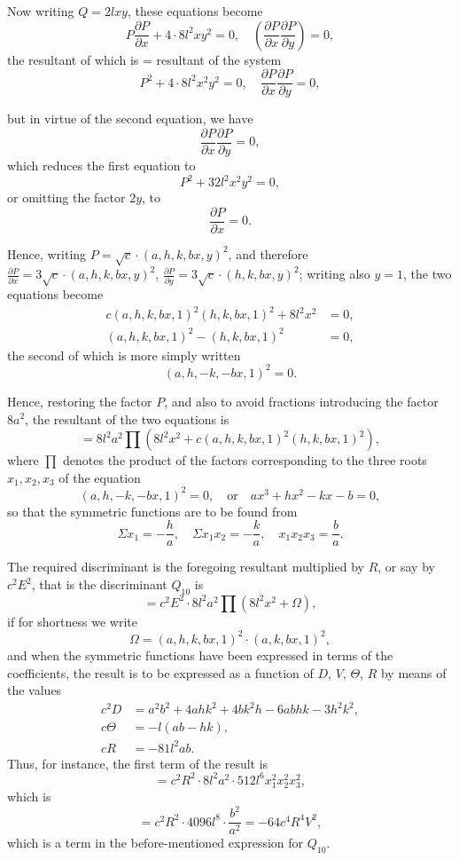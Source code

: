 \documentclass[11pt,a4paper]{article}
\theoremstyle{definition}
\begin{document}
Now writing $Q = 2lxy$, these equations become
\[
P\frac{\partial P}{\partial x} + 4\cdot 8l^2xy^2 = 0,\quad \left(\frac{\partial P}{\partial x}\frac{\partial P}{\partial y}\right) = 0,
\]
the resultant of which is = resultant of the system
\[
P^2 + 4\cdot 8l^2x^2y^2 = 0,\quad \frac{\partial P}{\partial x}\frac{\partial P}{\partial y} = 0,
\]

\newpage

but in virtue of the second equation, we have
\[
\frac{\partial P}{\partial x}\frac{\partial P}{\partial y} = 0,
\]
which reduces the first equation to
\[
P^2 + 32l^2x^2y^2 = 0,
\]
or omitting the factor $2y$, to
\[
\frac{\partial P}{\partial x} = 0.
\]

Hence, writing $P = \sqrt{c} \cdot (a,h,k,b x,y)^2$, and therefore $\frac{\partial P}{\partial x} = 3\sqrt{c} \cdot (a,h,k,b x,y)^2$, $\frac{\partial P}{\partial y} = 3\sqrt{c} \cdot (h,k,b x,y)^2$; writing also $y = 1$, the two equations become
\begin{align*}
c(a,h,k,b x,1)^2(h,k,b x,1)^2 + 8l^2x^2 &= 0,\\
(a,h,k,b x,1)^2 - (h,k,b x,1)^2 &= 0,
\end{align*}
the second of which is more simply written
\[
(a,h,-k,-b x,1)^2 = 0.
\]

Hence, restoring the factor $P$, and also to avoid fractions introducing the factor $8a^2$, the resultant of the two equations is
\[
= 8l^2a^2 \prod (8l^2x^2 + c(a,h,k,b x,1)^2(h,k,b x,1)^2),
\]
where $\prod$ denotes the product of the factors corresponding to the three roots $x_1, x_2, x_3$ of the equation
\[
(a,h,-k,-b x,1)^2 = 0,\quad \text{or}\quad ax^3 + hx^2 - kx - b = 0,
\]
so that the symmetric functions are to be found from
\[
\Sigma x_1 = -\frac{h}{a},\quad \Sigma x_1x_2 = -\frac{k}{a},\quad x_1x_2x_3 = \frac{b}{a}.
\]

\newpage

The required discriminant is the foregoing resultant multiplied by $R$, or say by $c^2E^2$, that is the discriminant $Q_{10}$ is
\[
= c^2E^2 \cdot 8l^2a^2 \prod (8l^2x^2 + \Omega),
\]
if for shortness we write
\[
\Omega = (a,h,k,b x,1)^2 \cdot (a,k,b x,1)^2,
\]
and when the symmetric functions have been expressed in terms of the coefficients, the result is to be expressed as a function of $D$, $V$, $\Theta$, $R$ by means of the values
\begin{align*}
c^2D &= a^2b^2 + 4ahk^2 + 4bk^2h - 6abhk - 3h^2k^2,\\
c\Theta &= -l(ab - hk),\\
cR &= -81l^2ab.
\end{align*}
Thus, for instance, the first term of the result is
\[
= c^2R^2 \cdot 8l^2a^2 \cdot 512l^6x_1^2x_2^2x_3^2,
\]
which is
\[
= c^2R^2 \cdot 4096l^8 \cdot \frac{b^2}{a^2} = -64c^4R^4V^2,
\]
which is a term in the before-mentioned expression for $Q_{10}$.
\end{document}
